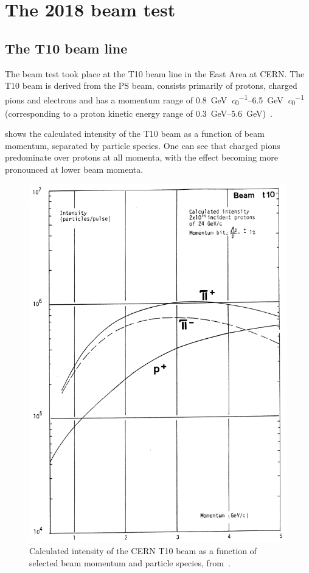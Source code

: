 \section{The 2018 beam test}
\label{sec:hptpc_beam_flux:overview}

\subsection{The T10 beam line}
\label{sec:hptpc_beam_flux:overview:t10}

The beam test took place at the T10 beam line in the East Area at CERN.
The T10 beam is derived from the PS beam, consists primarily of protons, charged pions and electrons and has a momentum range of \SIrange{0.8}{6.5}{\giga\electronvolt\per\clight} (corresponding to a proton kinetic energy range of \SIrange{0.3}{5.6}{\giga\electronvolt})~\cite{t10Report}.

 shows the calculated intensity of the T10 beam as a function of beam momentum, separated by particle species.
One can see that charged pions predominate over protons at all momenta, with the effect becoming more pronounced at lower beam momenta.

\begin{figure}[h]
  \centering
  \includegraphics[width=.6\linewidth]{files/figures/hptpc_beam_flux/t10Comp}
  \caption[Calculated intensity of the CERN T10 beam as a function of selected beam momentum and particle species.]{Calculated intensity of the CERN T10 beam as a function of selected beam momentum and particle species, from~\cite{t10Report}.}
  \label{fig:t10Calc}
\end{figure}

